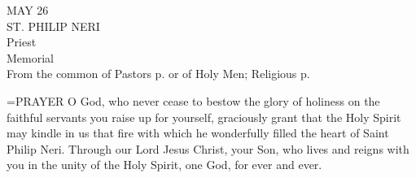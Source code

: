 \begin{center}\normalsize MAY 26\\
\footnotesize ST. PHILIP NERI\\
\footnotesize Priest\\
\footnotesize Memorial\\
\footnotesize From the common of Pastors p.     or of Holy Men; Religious p. \\
\end{center}

\hangindent=\parindent \small{PRAYER 
O God, who never cease to bestow the glory of holiness
on the faithful servants you raise up for yourself,
graciously grant
that the Holy Spirit may kindle in us that fire
with which he wonderfully filled
the heart of Saint Philip Neri.
Through our Lord Jesus Christ, your Son,
who lives and reigns with you in the unity of the Holy Spirit,
one God, for ever and ever.\\}
 
